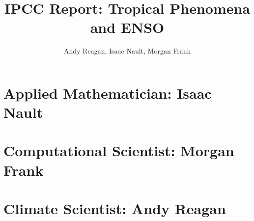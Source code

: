 \documentclass[onecolumn]{article}
\author{Andy Reagan, Isaac Nault, Morgan Frank}
\title{IPCC Report: Tropical Phenomena and ENSO}
\begin{document}
\maketitle

\pagebreak

\tableofcontents

\pagebreak
\section{Applied Mathematician: Isaac Nault}
\linespread{2}



\pagebreak
\section{Computational Scientist: Morgan Frank}


\pagebreak
\section{Climate Scientist: Andy Reagan}

\end{document}
